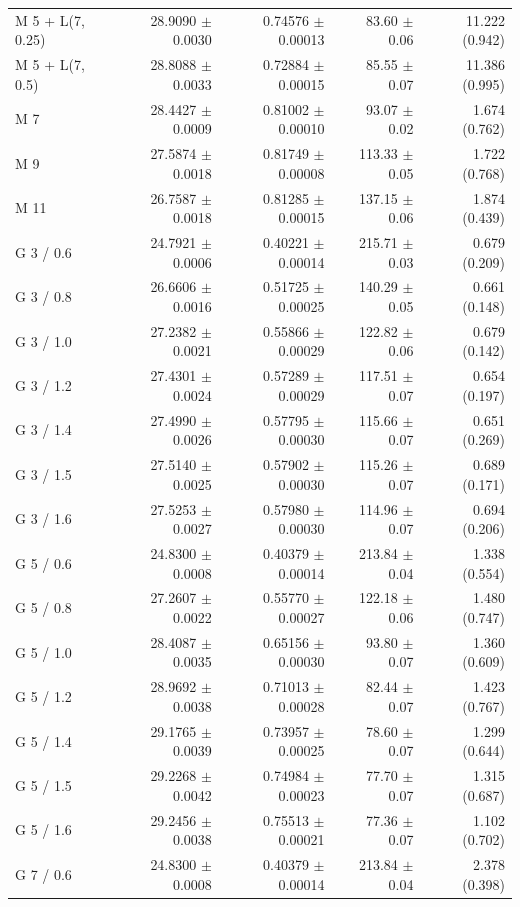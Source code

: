 \begin{longtable}{lrrrr}
M 5 + L(7, 0.25) & 28.9090 $\pm$ 0.0030 & 0.74576 $\pm$ 0.00013 & 83.60 $\pm$ 0.06 & 11.222 (0.942) \\
M 5 + L(7, 0.5) & 28.8088 $\pm$ 0.0033 & 0.72884 $\pm$ 0.00015 & 85.55 $\pm$ 0.07 & 11.386 (0.995) \\
M 7 & 28.4427 $\pm$ 0.0009 & 0.81002 $\pm$ 0.00010 & 93.07 $\pm$ 0.02 & 1.674 (0.762) \\
M 9 & 27.5874 $\pm$ 0.0018 & 0.81749 $\pm$ 0.00008 & 113.33 $\pm$ 0.05 & 1.722 (0.768) \\
M 11 & 26.7587 $\pm$ 0.0018 & 0.81285 $\pm$ 0.00015 & 137.15 $\pm$ 0.06 & 1.874 (0.439) \\
G 3 / 0.6 & 24.7921 $\pm$ 0.0006 & 0.40221 $\pm$ 0.00014 & 215.71 $\pm$ 0.03 & 0.679 (0.209) \\
G 3 / 0.8 & 26.6606 $\pm$ 0.0016 & 0.51725 $\pm$ 0.00025 & 140.29 $\pm$ 0.05 & 0.661 (0.148) \\
G 3 / 1.0 & 27.2382 $\pm$ 0.0021 & 0.55866 $\pm$ 0.00029 & 122.82 $\pm$ 0.06 & 0.679 (0.142) \\
G 3 / 1.2 & 27.4301 $\pm$ 0.0024 & 0.57289 $\pm$ 0.00029 & 117.51 $\pm$ 0.07 & 0.654 (0.197) \\
G 3 / 1.4 & 27.4990 $\pm$ 0.0026 & 0.57795 $\pm$ 0.00030 & 115.66 $\pm$ 0.07 & 0.651 (0.269) \\
G 3 / 1.5 & 27.5140 $\pm$ 0.0025 & 0.57902 $\pm$ 0.00030 & 115.26 $\pm$ 0.07 & 0.689 (0.171) \\
G 3 / 1.6 & 27.5253 $\pm$ 0.0027 & 0.57980 $\pm$ 0.00030 & 114.96 $\pm$ 0.07 & 0.694 (0.206) \\
G 5 / 0.6 & 24.8300 $\pm$ 0.0008 & 0.40379 $\pm$ 0.00014 & 213.84 $\pm$ 0.04 & 1.338 (0.554) \\
G 5 / 0.8 & 27.2607 $\pm$ 0.0022 & 0.55770 $\pm$ 0.00027 & 122.18 $\pm$ 0.06 & 1.480 (0.747) \\
G 5 / 1.0 & 28.4087 $\pm$ 0.0035 & 0.65156 $\pm$ 0.00030 & 93.80 $\pm$ 0.07 & 1.360 (0.609) \\
G 5 / 1.2 & 28.9692 $\pm$ 0.0038 & 0.71013 $\pm$ 0.00028 & 82.44 $\pm$ 0.07 & 1.423 (0.767) \\
G 5 / 1.4 & 29.1765 $\pm$ 0.0039 & 0.73957 $\pm$ 0.00025 & 78.60 $\pm$ 0.07 & 1.299 (0.644) \\
G 5 / 1.5 & 29.2268 $\pm$ 0.0042 & 0.74984 $\pm$ 0.00023 & 77.70 $\pm$ 0.07 & 1.315 (0.687) \\
G 5 / 1.6 & 29.2456 $\pm$ 0.0038 & 0.75513 $\pm$ 0.00021 & 77.36 $\pm$ 0.07 & 1.102 (0.702) \\
G 7 / 0.6 & 24.8300 $\pm$ 0.0008 & 0.40379 $\pm$ 0.00014 & 213.84 $\pm$ 0.04 & 2.378 (0.398) \\

\end{longtable}
